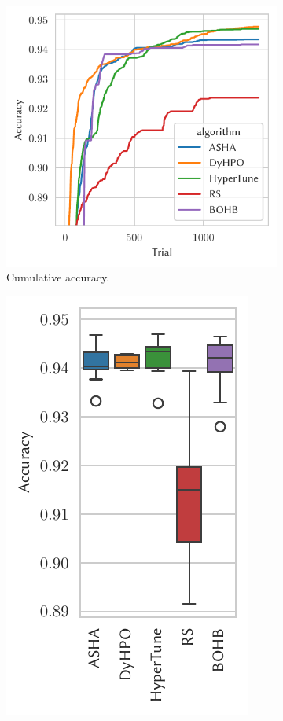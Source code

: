 \begin{figure}[H]
    \begin{subfigure}{.47\textwidth}
        \includegraphics[height=\plotheight]{img/real_exp/svhn_simple_plot.pdf}%
        \caption{Cumulative accuracy.}%
    \end{subfigure}%
    \begin{subfigure}{.26\textwidth}
        \includegraphics[height=\plotheight]{img/real_exp/svhn_simple_boxplot_half.pdf}%

\end{subfigure}
\end{figure}
